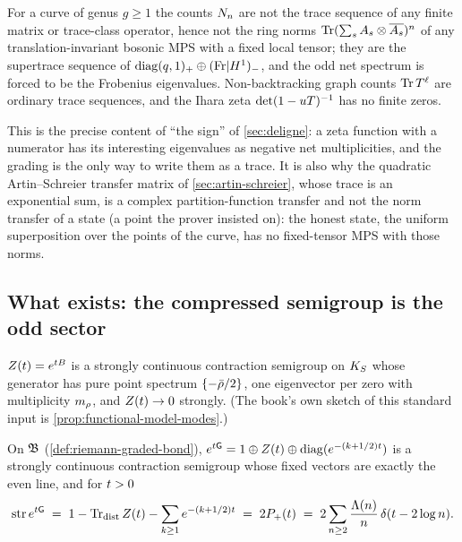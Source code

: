 \begin{corollary}
\label{cor:curve-counts-graded}
For a curve of genus $g\ge1$ the counts $N_{n}$ are not the trace sequence of any
finite matrix or trace-class operator, hence not the ring norms $\operatorname{Tr}(\sum_sA_{s}\otimes
\overline{A_{s}})^n$ of any translation-invariant bosonic MPS with a fixed local tensor;
they are the supertrace sequence of $\operatorname{diag}(q,1)_+\oplus(\mathrm{Fr}|H^1)_-$, and
the odd net spectrum is forced to be the Frobenius eigenvalues. Non-backtracking graph
counts $\operatorname{Tr}T^{\ell}$ are ordinary trace sequences, and the Ihara zeta
$\det(1-uT)^{-1}$ has no finite zeros.
\end{corollary}

This is the precise content of ``the sign'' of \cref{sec:deligne}: a zeta function with
a numerator has its interesting eigenvalues as negative net multiplicities, and the grading
is the only way to write them as a trace. It is also why the quadratic Artin--Schreier
transfer matrix of \cref{sec:artin-schreier}, whose trace is an exponential sum, is a
complex partition-function transfer and not the norm transfer of a state (a point the
prover insisted on): the honest state, the uniform superposition over the points of the
curve, has no fixed-tensor MPS with those norms.

\subsection{What exists: the compressed semigroup is the odd sector}

\begin{assumption}
\label{asm:lax-phillips-modes}
$Z(t) = e^{tB}$ is a strongly continuous contraction semigroup on $K_S$ whose
generator has pure point spectrum $\{-\bar{\rho}/2\}$, one eigenvector per zero with
multiplicity $m_\rho$, and $Z(t)\to0$ strongly. (The book's own sketch of this standard
input is \cref{prop:functional-model-modes}.)
\end{assumption}

\begin{proposition}
\label{prop:riemann-graded-generator}
On $\mathfrak B$ (\cref{def:riemann-graded-bond}), $e^{t\mathsf G} = 1\oplus Z(t)\oplus
\operatorname{diag}(e^{-(k+1/2)t})$ is a strongly continuous contraction semigroup
whose fixed vectors are exactly the even line, and for $t>0$
\[
  \operatorname{str} e^{t\mathsf G} \;=\; 1 - \operatorname{Tr}_{\mathrm{dist}}Z(t) - \sum_{k\ge1}e^{-(k+1/2)t}
  \;=\; 2P_{+}(t) \;=\; 2\sum_{n\ge2}\frac{\Lambda(n)}{n}\,\delta(t-2\log n).
\]
\end{proposition}

